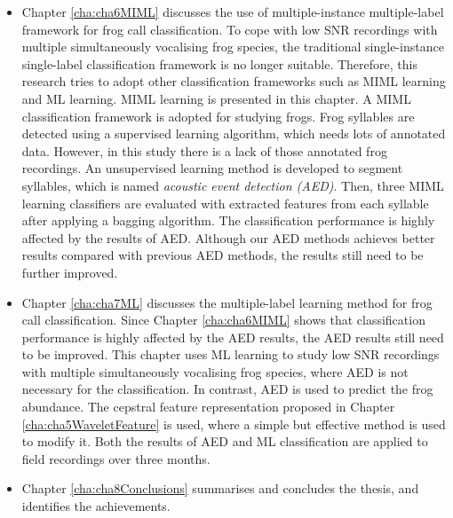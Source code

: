 \begin{itemize}
\item  Chapter \ref{cha:cha6MIML} discusses the use of multiple-instance multiple-label framework for frog call classification. To cope with low SNR recordings with multiple simultaneously vocalising frog species, the traditional single-instance single-label classification framework is no longer suitable. Therefore, this research tries to adopt other classification frameworks such as MIML learning and ML learning. MIML learning is presented in this chapter. A MIML classification framework is adopted for studying frogs. Frog syllables are detected using a supervised learning algorithm, which needs lots of annotated data. However, in this study there is a lack of those annotated frog recordings. An unsupervised learning method is developed to segment syllables, which is named \textit{acoustic event detection (AED)}. Then, three MIML learning classifiers are evaluated with extracted features from each syllable after applying a bagging algorithm. The classification performance is highly affected by the results of AED. Although our AED methods achieves better results compared with previous AED methods, the results still need to be further improved.


\item  Chapter \ref{cha:cha7ML} discusses the multiple-label learning method for frog call classification. Since Chapter \ref{cha:cha6MIML} shows that classification performance is highly affected by the AED results, the AED results still need to be improved. This chapter uses ML learning to study low SNR recordings with multiple simultaneously vocalising frog species, where AED is not necessary for the classification. In contrast, AED is used to predict the frog abundance. The cepstral feature representation proposed in Chapter \ref{cha:cha5WaveletFeature} is used, where a simple but effective method is used to modify it. Both the results of AED and ML classification are applied to field recordings over three months. 



\item  Chapter \ref{cha:cha8Conclusions} summarises and concludes the thesis, and identifies the achievements.



\end{itemize}





